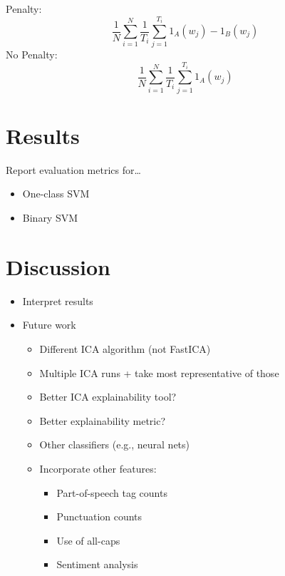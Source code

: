 \documentclass{article}
\begin{document}
Penalty: \[
\frac{1}{N} \sum_{i=1}^{N} \frac{1}{T_i} \sum_{j=1}^{T_i} 1_A(w_j) - 1_B(w_j)
\] No Penalty: \[
\frac{1}{N} \sum_{i=1}^{N} \frac{1}{T_i} \sum_{j=1}^{T_i} 1_A(w_j)
\]

\hypertarget{results}{%
\section{Results}\label{results}}

\label{sec:results} Report evaluation metrics for\ldots{}

\begin{itemize}
\tightlist
\item
  One-class SVM
\item
  Binary SVM
\end{itemize}

\hypertarget{discussion}{%
\section{Discussion}\label{discussion}}

\label{sec:discuss}

\begin{itemize}
\tightlist
\item
  Interpret results
\item
  Future work

  \begin{itemize}
  \tightlist
  \item
    Different ICA algorithm (not FastICA)
  \item
    Multiple ICA runs + take most representative of those
  \item
    Better ICA explainability tool?
  \item
    Better explainability metric?
  \item
    Other classifiers (e.g., neural nets)
  \item
    Incorporate other features:

    \begin{itemize}
    \tightlist
    \item
      Part-of-speech tag counts
    \item
      Punctuation counts
    \item
      Use of all-caps
    \item
      Sentiment analysis
    \end{itemize}
  \end{itemize}
\end{itemize}
\end{document}
